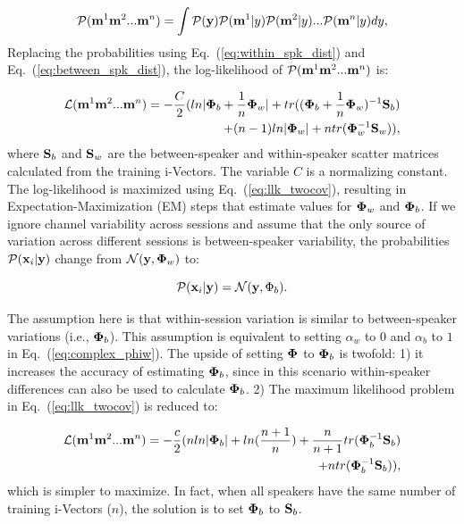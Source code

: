 \begin{equation}
\mathcal{P}({\bf m}^1 {\bf m}^2 ... {\bf m}^n) = \int \mathcal{P}({\bf y}) \mathcal{P}({\bf m}^1 | y) \mathcal{P}({\bf m}^2 | y) ... \mathcal{P}({\bf m}^n | y) dy,
\end{equation}
Replacing the probabilities using Eq.~(\ref{eq:within_spk_dist}) and Eq.~(\ref{eq:between_spk_dist}), the log-likelihood of $\mathcal{P}({\bf m}^1 {\bf m}^2 ... {\bf m}^n)$ is: 


\begin{equation}
\label{eq:llk_twocov}
\begin{split}
\mathcal{L}({\bf m}^1 {\bf m}^2 ... {\bf m}^n) = -\frac{C}{2}(ln | {\bf \Phi}_b + \frac{1}{n}{\bf \Phi}_w | + tr(({\bf \Phi}_b + \frac{1}{n}{\bf \Phi}_w)^{-1}{\bf S}_b) \\+ (n-1)ln|{\bf \Phi}_w| + ntr({\bf \Phi}_w^{-1}{\bf S}_w)),
\end{split}
\end{equation}
where ${\bf S}_b$ and ${\bf S}_w$ are the between-speaker and within-speaker scatter matrices calculated from the training i-Vectors. The variable $C$ is a normalizing constant. 
The log-likelihood is maximized using Eq.~(\ref{eq:llk_twocov}), resulting in Expectation-Maximization (EM) steps that estimate values for ${\bf \Phi}_w$ and ${\bf \Phi}_b$. 
If we ignore channel variability across sessions and assume that the only source of variation across different sessions is between-speaker variability, the probabilities $\mathcal{P} ({\bf x}_i | {\bf y})$ change from $\mathcal{N} ({\bf y},{\bf \Phi}_w)$ to: 

\begin{equation}
\mathcal{P} ({\bf x}_i | {\bf y}) = \mathcal{N} ({\bf y},\Phi_b).
\end{equation}

The assumption here is that within-session variation is similar to between-speaker variations (i.e., ${\bf \Phi}_b$). 
This assumption is equivalent to setting $\alpha_w$ to $0$ and $\alpha_b$ to $1$ in Eq.~(\ref{eq:complex_phiw}). 
The upside of setting ${\bf \Phi}$ to ${\bf \Phi}_b$ is twofold: 1) it increases the accuracy of estimating ${\bf \Phi}_b$, since in this scenario within-speaker differences can also be used to calculate ${\bf \Phi}_b$. 2) The maximum likelihood problem in Eq.~(\ref{eq:llk_twocov}) is reduced to:

\begin{equation}
\label{eq:llk_onecov}
\begin{split}
\mathcal{L}({\bf m}^1 {\bf m}^2 ... {\bf m}^n) = -\frac{c}{2}(nln | {\bf \Phi}_b | + ln(\frac{n+1}{n})+ \frac{n}{n+1}tr({\bf \Phi}_b^{-1}{\bf S}_b) \\+ ntr({\bf \Phi}_b^{-1}{\bf S}_b)),
\end{split}
\end{equation}
which is simpler to maximize. In fact, when all speakers have the same number of training i-Vectors ($n$), the solution is to set ${\bf \Phi}_b$ to ${\bf S}_b$. 


